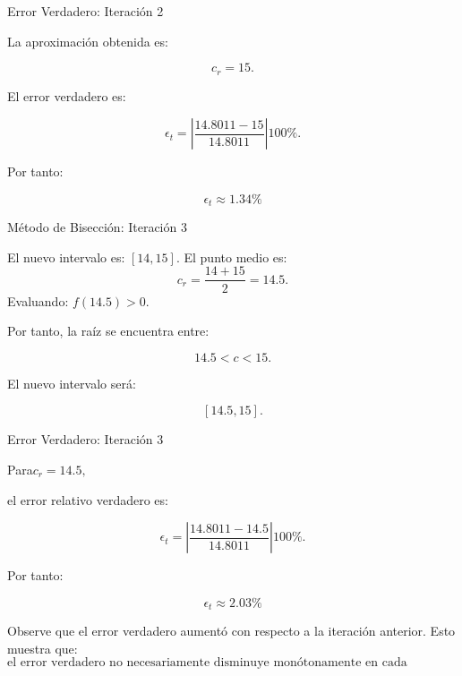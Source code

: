 \documentclass[../../main.tex]{subfiles}
\begin{document}
\begin{frame}{Error Verdadero: Iteración 2}

La aproximación obtenida es:

\[
c_r=15.
\]

El error verdadero es:

\[
\epsilon_t
=
\left|
\frac{14.8011-15}{14.8011}
\right|
100\%.
\]

Por tanto:

\[
\boxed{
\epsilon_t\approx1.34\%
}
\]

\end{frame}



\begin{frame}{Método de Bisección: Iteración 3}

El nuevo intervalo es:
\(
[14,15].
\)
El punto medio es:
\[
c_r=
\frac{14+15}{2}
=14.5.
\]
Evaluando:
\(
f(14.5)>0.
\)

Por tanto, la raíz se encuentra entre:

\[
14.5<c<15.
\]

El nuevo intervalo será:

\[
[14.5,15].
\]

\end{frame}



\begin{frame}{Error Verdadero: Iteración 3}

Para\(
c_r=14.5,
\)

el error relativo verdadero es:

\[
\epsilon_t
=
\left|
\frac{14.8011-14.5}{14.8011}
\right|
100\%.
\]

Por tanto:

\[
\boxed{
\epsilon_t\approx2.03\%
}
\]

Observe que el error verdadero aumentó con respecto a la iteración anterior.
Esto muestra que:
\[
\boxed{
\text{el error verdadero no necesariamente disminuye
monótonamente en cada iteración}
}
\]

\end{frame}


\end{document}

